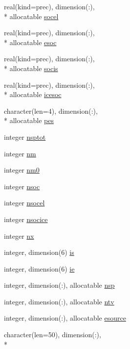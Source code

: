 \begin{DoxyCompactItemize}
real(kind=prec), dimension(\-:), \\*
allocatable \hyperlink{classplantvar_a325e0974aedb888a4814e7d9479c67d3}{socel}
\item 
real(kind=prec), dimension(\-:), \\*
allocatable \hyperlink{classplantvar_a52a6a33ef0efbd1e6b19c59c683db54a}{esoc}
\item 
real(kind=prec), dimension(\-:), \\*
allocatable \hyperlink{classplantvar_ab4064b573be9c1b9c4d96298feb717d5}{socis}
\item 
real(kind=prec), dimension(\-:), \\*
allocatable \hyperlink{classplantvar_a297631a7e3453200fc05d202522c19b6}{icesoc}
\item 
character(len=4), dimension(\-:), \\*
allocatable \hyperlink{classplantvar_a8b75644cc6f0b1728b0fdcd7c575c177}{pes}
\item 
integer \hyperlink{classplantvar_a1301bcb36aec6c118be8c084932de099}{nsptot}
\item 
integer \hyperlink{classplantvar_a137041d7f1c30cc7d248b9ada4feab69}{nm}
\item 
integer \hyperlink{classplantvar_a56d8f60e631d2b0dc2d7a0252a49e80e}{nm0}
\item 
integer \hyperlink{classplantvar_ac56a3422e256b7cdcc55623af8ba6c7b}{nsoc}
\item 
integer \hyperlink{classplantvar_a56078fb4f499089dd81db61a9e8dfc0f}{nsocel}
\item 
integer \hyperlink{classplantvar_a6b3064a5fca6688fa44ea9bbec34ec97}{nsocice}
\item 
integer \hyperlink{classplantvar_ac08eaef488f61f2e228ce9b823a3d1ab}{nx}
\item 
integer, dimension(6) \hyperlink{classplantvar_ac25b76f99d2e9c0b602a81c59e5bdc03}{is}
\item 
integer, dimension(6) \hyperlink{classplantvar_ab30c259c0074e9d5499732c8d7090c66}{ie}
\item 
integer, dimension(\-:), allocatable \hyperlink{classplantvar_a16e98f1a836d4de3e5436365e77441b0}{nsp}
\item 
integer, dimension(\-:), allocatable \hyperlink{classplantvar_a019098844671b06b71ae0b76aa3d4fa8}{ntv}
\item 
integer, dimension(\-:), allocatable \hyperlink{classplantvar_ac5590ecfa29690829feb06fd8c1eb839}{esource}
\item 
character(len=50), dimension(\-:), \\*

\end{DoxyCompactItemize}
